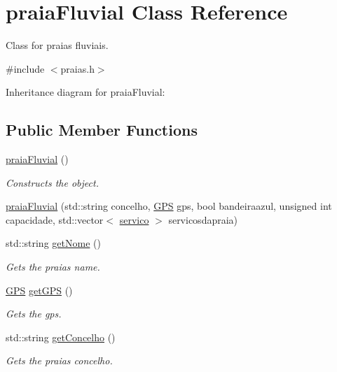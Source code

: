 \hypertarget{classpraiaFluvial}{}\section{praia\+Fluvial Class Reference}
\label{classpraiaFluvial}


Class for praias fluviais.  




{\ttfamily \#include $<$praias.\+h$>$}



Inheritance diagram for praia\+Fluvial\+:
\subsection*{Public Member Functions}
\begin{DoxyCompactItemize}
\item 
\hyperlink{classpraiaFluvial_ab88371de4e3b999d9150d1ee5d7f7673}{praia\+Fluvial} ()
\begin{DoxyCompactList}\small\item\em Constructs the object. \end{DoxyCompactList}\item 
\hyperlink{classpraiaFluvial_af3c19d2d92baca3af82dc8bd746ffb6d}{praia\+Fluvial} (std\+::string concelho, \hyperlink{classGPS}{G\+PS} gps, bool bandeiraazul, unsigned int capacidade, std\+::vector$<$ \hyperlink{classservico}{servico} $>$ servicosdapraia)
\item 
std\+::string \hyperlink{classpraiaFluvial_a79762e3121b2339a952c92e82890824f}{get\+Nome} ()
\begin{DoxyCompactList}\small\item\em Gets the praia\textquotesingle{}s name. \end{DoxyCompactList}\item 
\hyperlink{classGPS}{G\+PS} \hyperlink{classpraiaFluvial_ab1fc0621e1e2d7f1a11ef05ccc2c3af0}{get\+G\+PS} ()
\begin{DoxyCompactList}\small\item\em Gets the gps. \end{DoxyCompactList}\item 
std\+::string \hyperlink{classpraiaFluvial_aac6c4fd01595f9455f43b8bddb069d9d}{get\+Concelho} ()
\begin{DoxyCompactList}\small\item\em Gets the praia\textquotesingle{}s concelho. \end{DoxyCompactList}\item 

\end{DoxyCompactItemize}

